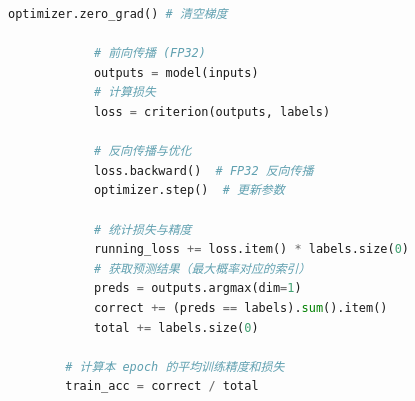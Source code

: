 \begin{lstlisting}[language=Python]
            optimizer.zero_grad() # 清空梯度
            
            # 前向传播 (FP32)
            outputs = model(inputs)
            # 计算损失
            loss = criterion(outputs, labels)
            
            # 反向传播与优化
            loss.backward()  # FP32 反向传播
            optimizer.step()  # 更新参数
            
            # 统计损失与精度
            running_loss += loss.item() * labels.size(0)
            # 获取预测结果（最大概率对应的索引）
            preds = outputs.argmax(dim=1)
            correct += (preds == labels).sum().item()
            total += labels.size(0)
        
        # 计算本 epoch 的平均训练精度和损失
        train_acc = correct / total
\end{lstlisting}

